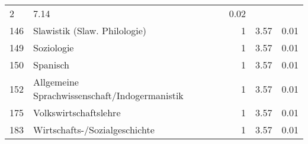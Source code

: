 \begin{longtable}{lXrrr}
       \num{2} &
       \num[round-mode=places,round-precision=2]{7,14} &
         \num[round-mode=places,round-precision=2]{0,02} \\

     146 &
     \multicolumn{1}{X}{ Slawistik (Slaw. Philologie)   } &


       \num{1} &
       \num[round-mode=places,round-precision=2]{3,57} &
         \num[round-mode=places,round-precision=2]{0,01} \\

     149 &
     \multicolumn{1}{X}{ Soziologie   } &


       \num{1} &
       \num[round-mode=places,round-precision=2]{3,57} &
         \num[round-mode=places,round-precision=2]{0,01} \\

     150 &
     \multicolumn{1}{X}{ Spanisch   } &


       \num{1} &
       \num[round-mode=places,round-precision=2]{3,57} &
         \num[round-mode=places,round-precision=2]{0,01} \\

     152 &
     \multicolumn{1}{X}{ Allgemeine Sprachwissenschaft/Indogermanistik   } &


       \num{1} &
       \num[round-mode=places,round-precision=2]{3,57} &
         \num[round-mode=places,round-precision=2]{0,01} \\

     175 &
     \multicolumn{1}{X}{ Volkswirtschaftslehre   } &


       \num{1} &
       \num[round-mode=places,round-precision=2]{3,57} &
         \num[round-mode=places,round-precision=2]{0,01} \\

     183 &
     \multicolumn{1}{X}{ Wirtschafts-/Sozialgeschichte   } &


       \num{1} &
       \num[round-mode=places,round-precision=2]{3,57} &
         \num[round-mode=places,round-precision=2]{0,01} \\


\end{longtable}
